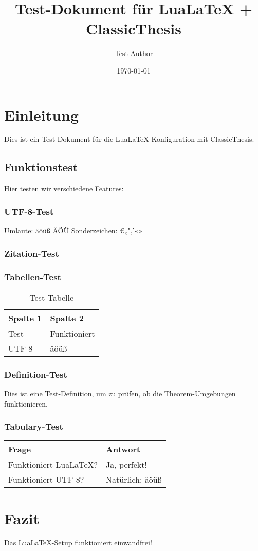 \documentclass[ngerman, twoside,openright,titlepage,numbers=noenddot,
                headinclude,footinclude,cleardoublepage=empty,abstract=on,
                BCOR=5mm,paper=a4,fontsize=11pt]{scrreprt}
\begin{document}
\frenchspacing
\raggedbottom
{}

\title{Test-Dokument für LuaLaTeX + ClassicThesis}
\author{Test Author}
\date{\today}
\maketitle

\chapter{Einleitung}

Dies ist ein Test-Dokument für die LuaLaTeX-Konfiguration mit ClassicThesis.

\section{Funktionstest}

Hier testen wir verschiedene Features:

\subsection{UTF-8-Test}
Umlaute: äöüß ÄÖÜ
Sonderzeichen: €„"‚'«»

\subsection{Zitation-Test}

\subsection{Tabellen-Test}
\begin{table}[h]
\centering
\begin{tabular}{ll}
\toprule
Spalte 1 & Spalte 2 \\
\midrule
Test & Funktioniert \\
UTF-8 & äöüß \\
\bottomrule
\end{tabular}
\caption{Test-Tabelle}
\end{table}

\subsection{Definition-Test}
\begin{definition}
Dies ist eine Test-Definition, um zu prüfen, ob die Theorem-Umgebungen funktionieren.
\end{definition}

\subsection{Tabulary-Test}
\begin{tabulary}{0.8\textwidth}{LL}
Frage & Antwort \\
\midrule
Funktioniert LuaLaTeX? & Ja, perfekt! \\
Funktioniert UTF-8? & Natürlich: äöüß \\
\end{tabulary}

\chapter{Fazit}
Das LuaLaTeX-Setup funktioniert einwandfrei! 🎉
\end{document}

